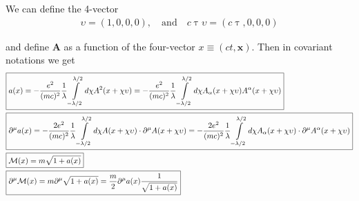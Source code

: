 We can define the 4-vector
\begin{align}
 \upsilon = (1,0,0,0),\quad  \text{and}\quad c\uptau\upsilon = (c\uptau, 0, 0, 0)
\end{align}

and define ${\bm A}$ as a function of the four-vector $x\equiv (ct,{\bm x})$. Then in covariant notations we get
\begin{align}
& \boxed{a(x) = -\frac{e^2}{(mc)^2}\frac1{\lambda}\int\limits_{-\lambda/2}^{\lambda/2} d\chi  { A}^2(x + \chi \upsilon)=-\frac{e^2}{(mc)^2}\frac1{\lambda}\int\limits_{-\lambda/2}^{\lambda/2} d\chi   A_\alpha(x + \chi \upsilon) A^\alpha(x + \chi \upsilon)}\\
&\boxed{\partial^\mu a(x) = -\frac{2e^2}{(mc)^2}\frac1{\lambda}\int\limits_{-\lambda/2}^{\lambda/2} d\chi  { A}(x + \chi \upsilon)\cdot\partial^\mu{ A}(x + \chi \upsilon)=-\frac{2e^2}{(mc)^2}\frac1{\lambda}\int\limits_{-\lambda/2}^{\lambda/2} d\chi  { A}_\alpha(x + \chi \upsilon)\cdot\partial^\mu{ A}^\alpha(x + \chi \upsilon)}\\
&\boxed{{\cal M}(x) = m  \sqrt{1+a(x)}}\\
&\boxed{\partial^\mu {\cal M}(x) =m\partial^\mu\sqrt{1+a(x)}=\frac m2{\partial^\mu a(x)}\frac1{\sqrt{1+a(x)}}}
\end{align}
